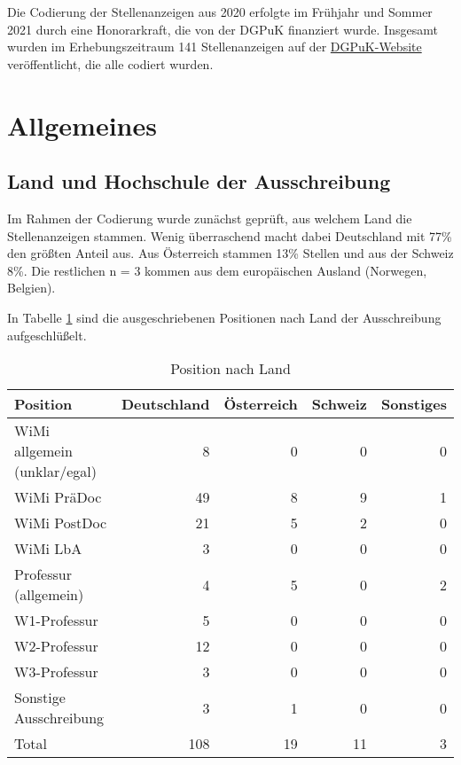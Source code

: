 \documentclass[
]{article}
\begin{document}
Die Codierung der Stellenanzeigen aus 2020 erfolgte im Frühjahr und Sommer 2021 durch eine Honorarkraft, die von der DGPuK finanziert wurde. Insgesamt wurden im Erhebungszeitraum 141 Stellenanzeigen auf der \href{https://www.dgpuk.de/de/stellenangebote.html}{DGPuK-Website} veröffentlicht, die alle codiert wurden.

\hypertarget{allgemeines}{%
\section{Allgemeines}\label{allgemeines}}

\hypertarget{land-und-hochschule-der-ausschreibung}{%
\subsection{Land und Hochschule der Ausschreibung}\label{land-und-hochschule-der-ausschreibung}}

Im Rahmen der Codierung wurde zunächst geprüft, aus welchem Land die Stellenanzeigen stammen. Wenig überraschend macht dabei Deutschland mit 77\% den größten Anteil aus. Aus Österreich stammen 13\% Stellen und aus der Schweiz 8\%. Die restlichen n = 3 kommen aus dem europäischen Ausland (Norwegen, Belgien).

In Tabelle \ref{tab:pospercountry} sind die ausgeschriebenen Positionen nach Land der Ausschreibung aufgeschlüßelt.

\begin{table}[H]

\caption{\label{tab:pospercountry}Position nach Land}
\centering
\begin{tabular}[t]{l|r|r|r|r}
\hline
Position & Deutschland & Österreich & Schweiz & Sonstiges\\
\hline
WiMi allgemein (unklar/egal) & 8 & 0 & 0 & 0\\
\hline
WiMi PräDoc & 49 & 8 & 9 & 1\\
\hline
WiMi PostDoc & 21 & 5 & 2 & 0\\
\hline
WiMi LbA & 3 & 0 & 0 & 0\\
\hline
Professur (allgemein) & 4 & 5 & 0 & 2\\
\hline
W1-Professur & 5 & 0 & 0 & 0\\
\hline
W2-Professur & 12 & 0 & 0 & 0\\
\hline
W3-Professur & 3 & 0 & 0 & 0\\
\hline
Sonstige Ausschreibung & 3 & 1 & 0 & 0\\
\hline
Total & 108 & 19 & 11 & 3\\
\hline
\end{tabular}
\end{table}
\end{document}
